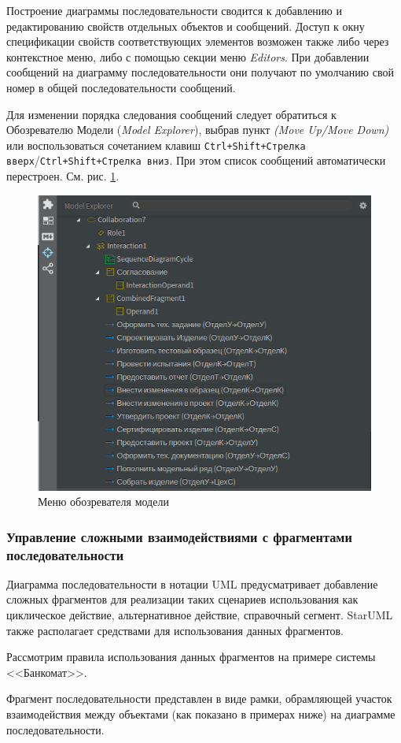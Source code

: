 \documentclass[a4paper,12pt]{report}
\newcommand{\staruml}{StarUML\,\tm}
\begin{document}
Построение диаграммы последовательности сводится к добавлению и редактированию свойств отдельных объектов и сообщений. Доступ к окну спецификации свойств соответствующих элементов возможен также либо через контекстное меню, либо с помощью секции меню \textit{Editors}. При добавлении сообщений на диаграмму последовательности они получают по умолчанию свой номер в общей последовательности сообщений.

Для изменении порядка следования сообщений следует обратиться к Обозревателю Модели (\textit{Model Explorer}), выбрав пункт \textit{(Move Up/Move Down)} или воспользоваться сочетанием клавиш \texttt{Ctrl+Shift+Стрелка вверх}/\texttt{Ctrl+Shift+Стрелка вниз}. При этом список сообщений автоматически перестроен. См. рис. \ref{fig:sequenceexplorer}.

\begin{figure}[h!]
	\centering
	\includegraphics[width=0.5\linewidth]{images/sequenceexplorer}
	\caption{Меню обозревателя модели}
	\label{fig:sequenceexplorer}
\end{figure}

\subsubsection*{Управление сложными взаимодействиями с фрагментами последовательности}

Диаграмма последовательности в нотации UML предусматривает добавление сложных фрагментов для реализации таких сценариев использования как циклическое действие, альтернативное действие, справочный сегмент. \staruml также располагает средствами для использования данных фрагментов. 

Рассмотрим правила использования данных фрагментов на примере системы <<Банкомат>>.

Фрагмент последовательности представлен в виде рамки, обрамляющей участок взаимодействия между объектами (как показано в примерах ниже) на диаграмме последовательности.
\end{document}
